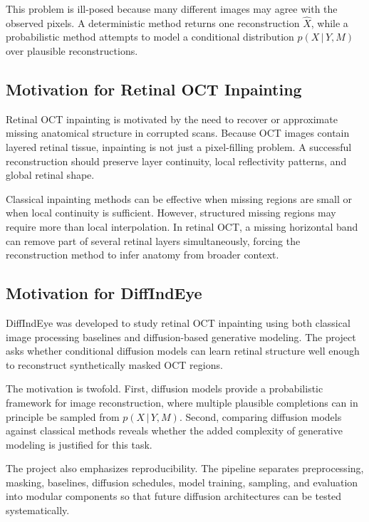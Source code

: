 \documentclass[12pt,oneside]{article}
\newcommand{\given}{\,|\,}
\begin{document}
This problem is ill-posed because many different images may agree with the observed pixels. A deterministic method returns one reconstruction $\hat{X}$, while a probabilistic method attempts to model a conditional distribution $p(X \given Y,M)$ over plausible reconstructions.

\subsection*{Motivation for Retinal OCT Inpainting}

Retinal OCT inpainting is motivated by the need to recover or approximate missing anatomical structure in corrupted scans. Because OCT images contain layered retinal tissue, inpainting is not just a pixel-filling problem. A successful reconstruction should preserve layer continuity, local reflectivity patterns, and global retinal shape.

Classical inpainting methods can be effective when missing regions are small or when local continuity is sufficient. However, structured missing regions may require more than local interpolation. In retinal OCT, a missing horizontal band can remove part of several retinal layers simultaneously, forcing the reconstruction method to infer anatomy from broader context.

\subsection{Motivation for DiffIndEye}

DiffIndEye was developed to study retinal OCT inpainting using both classical image processing baselines and diffusion-based generative modeling. The project asks whether conditional diffusion models can learn retinal structure well enough to reconstruct synthetically masked OCT regions.

The motivation is twofold. First, diffusion models provide a probabilistic framework for image reconstruction, where multiple plausible completions can in principle be sampled from $p(X \given Y,M)$. Second, comparing diffusion models against classical methods reveals whether the added complexity of generative modeling is justified for this task.

The project also emphasizes reproducibility. The pipeline separates preprocessing, masking, baselines, diffusion schedules, model training, sampling, and evaluation into modular components so that future diffusion architectures can be tested systematically.
\end{document}
